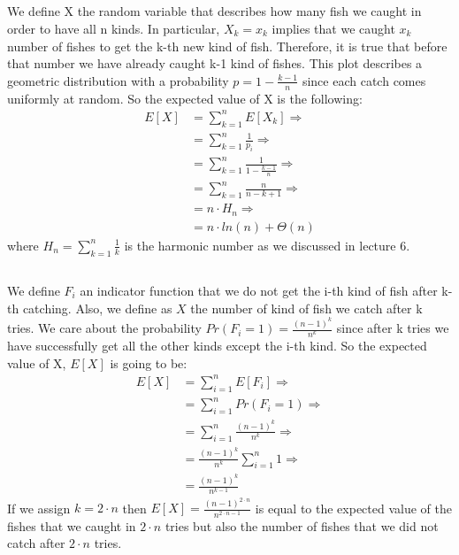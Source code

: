 \documentclass[11pt]{537homework}
\begin{document}
\subsection{}
We define X the random variable that describes how many fish we caught in order to have all n kinds. In particular, $X_k = x_k$ implies that we caught $x_k$ number of fishes to get the k-th new kind of fish. Therefore, it is true that before that number we have already caught k-1 kind of fishes. This plot describes a geometric distribution with a probability $p = 1 - \frac{k-1}{n}$ since each catch comes uniformly at random. So the expected value of X is the following:
\begingroup
\allowdisplaybreaks
\begin{align*}
 E[X] &= \sum_{k=1}^{n} E[X_k] \Longrightarrow\\
      &= \sum_{k=1}^{n} \frac{1}{p_i} \Longrightarrow\\
      &= \sum_{k=1}^{n} \frac{1}{1 - \frac{k-1}{n}} \Longrightarrow\\
      &= \sum_{k=1}^{n} \frac{n}{n-k+1} \Longrightarrow\\
      &= n\cdot H_n  \Longrightarrow\\
      &= n \cdot ln(n) + \Theta(n)
\end{align*}
\endgroup
where $H_n = \sum_{k=1}^{n} \frac{1}{k}$ is the harmonic number as we discussed in lecture 6.
\subsection{}
We define $F_i$ an indicator function that we do not get the i-th kind of fish after k-th catching. Also, we define as $X$ the number of kind of fish we catch after k tries. We care about the probability $Pr(F_i = 1) = \frac{(n-1)^k}{n^k}$ since after k tries we have successfully get all the other kinds except the i-th kind. So the expected value of X, $E[X]$ is going to be:
\begingroup
\allowdisplaybreaks
\begin{align*}
 E[X] &= \sum_{i=1}^{n} E[F_i] \Longrightarrow\\
      &= \sum_{i=1}^{n} Pr(F_i = 1) \Longrightarrow\\
      &= \sum_{i=1}^{n} \frac{(n-1)^k}{n^k} \Longrightarrow\\
      &= \frac{(n-1)^k}{n^k} \sum_{i=1}^{n} 1 \Longrightarrow\\
      &= \frac{(n-1)^k}{n^{k-1}}
\end{align*}
\endgroup
If we assign $k = 2\cdot n$ then $E[X] = \displaystyle{\frac{(n-1)^{2 \cdot n}}{n^{2 \cdot n -1}}}$ is equal to the expected value of the fishes that we caught in $2\cdot n$ tries but also the number of fishes that we did not catch after $2 \cdot n$ tries.
\end{document}
